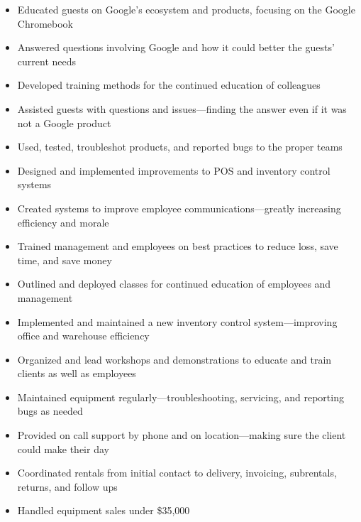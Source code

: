 \documentclass[letterpaper]{article}        %
\begin{document}

%

    \begin{itemize}
      \item Educated guests on Google's ecosystem and products, focusing on the Google Chromebook
      \item Answered questions involving Google and how it could better the guests' current needs
      \item Developed training methods for the continued education of colleagues
      \item Assisted guests with questions and issues---finding the answer even if it was not a Google product
      \item Used, tested, troubleshot products, and reported bugs to the proper teams
    \end{itemize}

    \begin{itemize}
      \item Designed and implemented improvements to POS and inventory control systems
      \item Created systems to improve employee communications---greatly increasing efficiency and morale
      \item Trained management and employees on best practices to reduce loss, save time, and save money
      \item Outlined and deployed classes for continued education of employees and management
    \end{itemize}

    \begin{itemize}
      \item Implemented and maintained a new inventory control system---improving office and warehouse efficiency
      \item Organized and lead workshops and demonstrations to educate and train clients as well as employees
      \item Maintained equipment regularly---troubleshooting, servicing, and reporting bugs as needed
      \item Provided on call support by phone and on location---making sure the client could make their day 
      \item Coordinated rentals from initial contact to delivery, invoicing, subrentals, returns, and follow ups
      \item Handled equipment sales under \$35,000
    \end{itemize}
\end{document}
